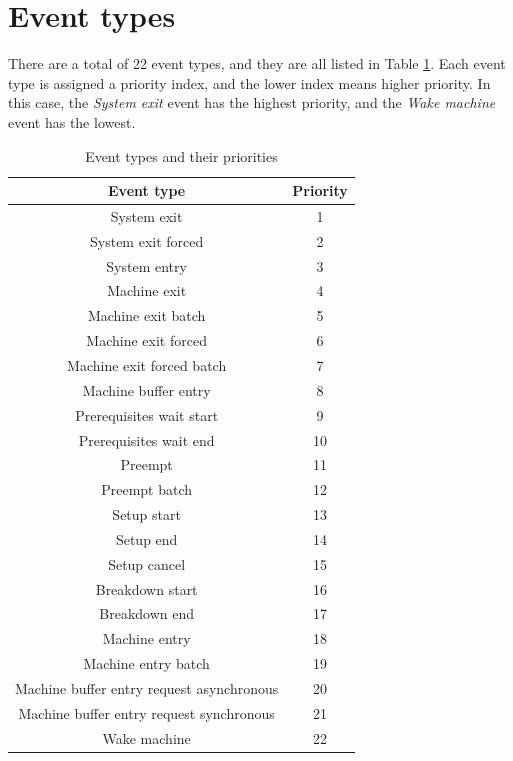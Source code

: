 \section{Event types}
\label{sec:event_types}

There are a total of 22 event types, and they are all listed in Table \ref{tab:event_types}. Each event type is assigned a priority index, and the lower index means higher priority. In this case, the \textit{System exit} event has the highest priority, and the \textit{Wake machine} event has the lowest.

\begin{table}[!htbp]
    \begin{center}
        \begin{tabular}{|c|c|} 
         \hline
         Event type & Priority \\ [0.5ex] 
         \hline\hline
         System exit & 1 \\ 
         \hline
         System exit forced & 2 \\
         \hline
         System entry & 3 \\
         \hline
         Machine exit & 4 \\
         \hline
         Machine exit batch & 5 \\
         \hline
         Machine exit forced & 6 \\
         \hline
         Machine exit forced batch & 7 \\
         \hline
         Machine buffer entry & 8 \\
         \hline
         Prerequisites wait start & 9 \\
         \hline
         Prerequisites wait end & 10 \\
         \hline
         Preempt & 11 \\
         \hline
         Preempt batch & 12 \\
         \hline
         Setup start & 13 \\
         \hline
         Setup end & 14 \\
         \hline
         Setup cancel & 15 \\
         \hline
         Breakdown start & 16 \\
         \hline
         Breakdown end & 17 \\
         \hline
         Machine entry & 18 \\
         \hline
         Machine entry batch & 19 \\
         \hline
         Machine buffer entry request asynchronous & 20 \\
         \hline
         Machine buffer entry request synchronous & 21 \\
         \hline
         Wake machine & 22 \\
         \hline
        \end{tabular}
        \end{center}
        \caption{Event types and their priorities}
    \label{tab:event_types}
    \end{table}
    
